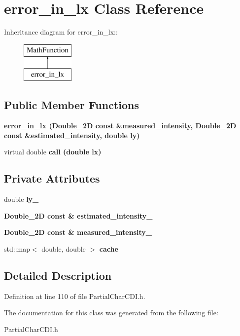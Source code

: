 \section{error\_\-in\_\-lx Class Reference}
\label{classerror__in__lx}
Inheritance diagram for error\_\-in\_\-lx::\begin{figure}[H]
\begin{center}
\leavevmode
\includegraphics[height=2cm]{classerror__in__lx}
\end{center}
\end{figure}
\subsection*{Public Member Functions}
\begin{CompactItemize}
\item 
\bf{error\_\-in\_\-lx} (\bf{Double\_\-2D} const \&measured\_\-intensity, \bf{Double\_\-2D} const \&estimated\_\-intensity, double ly)\label{classerror__in__lx_6e6d4ebfe39fdc2634da8d7c4b040f47}

\item 
virtual double \bf{call} (double lx)\label{classerror__in__lx_45eac67d018c9562c8099ede2ff8a1a6}

\end{CompactItemize}
\subsection*{Private Attributes}
\begin{CompactItemize}
\item 
double \bf{ly\_\-}\label{classerror__in__lx_0d11d91905e3478eea1e4191ef3eba90}

\item 
\bf{Double\_\-2D} const \& \bf{estimated\_\-intensity\_\-}\label{classerror__in__lx_85bdc0e073e46d3f7497b06951747715}

\item 
\bf{Double\_\-2D} const \& \bf{measured\_\-intensity\_\-}\label{classerror__in__lx_0a61fa8b39c2c1fa63e01ab8b876d533}

\item 
std::map$<$ double, double $>$ \bf{cache}\label{classerror__in__lx_31198834676c694a170da5652c401d5d}

\end{CompactItemize}


\subsection{Detailed Description}




Definition at line 110 of file Partial\-Char\-CDI.h.

The documentation for this class was generated from the following file:\begin{CompactItemize}
\item 
Partial\-Char\-CDI.h\end{CompactItemize}
